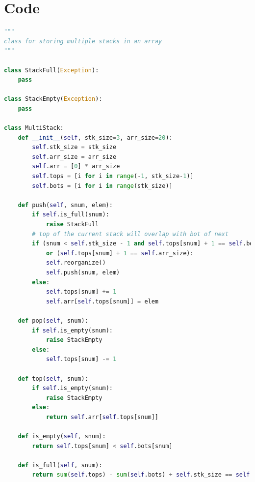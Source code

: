 \documentclass[12pt]{report}
\begin{document}
\chapter{Code}
\begin{lstlisting}[language=Python, caption=multistack.py]
"""
class for storing multiple stacks in an array
"""

class StackFull(Exception):
    pass

class StackEmpty(Exception):
    pass

class MultiStack:
    def __init__(self, stk_size=3, arr_size=20):
        self.stk_size = stk_size
        self.arr_size = arr_size
        self.arr = [0] * arr_size
        self.tops = [i for i in range(-1, stk_size-1)]
        self.bots = [i for i in range(stk_size)]

    def push(self, snum, elem):
        if self.is_full(snum):
            raise StackFull
        # top of the current stack will overlap with bot of next
        if (snum < self.stk_size - 1 and self.tops[snum] + 1 == self.bots[snum + 1])\
            or (self.tops[snum] + 1 == self.arr_size):
            self.reorganize()
            self.push(snum, elem)
        else:
            self.tops[snum] += 1
            self.arr[self.tops[snum]] = elem
    
    def pop(self, snum):
        if self.is_empty(snum):
            raise StackEmpty
        else:
            self.tops[snum] -= 1
    
    def top(self, snum):
        if self.is_empty(snum):
            raise StackEmpty
        else:
            return self.arr[self.tops[snum]]
    
    def is_empty(self, snum):
        return self.tops[snum] < self.bots[snum]
    
    def is_full(self, snum):
        return sum(self.tops) - sum(self.bots) + self.stk_size == self.arr_size


\end{lstlisting}
\end{document}
